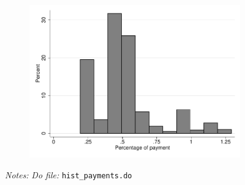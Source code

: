 \documentclass[11pt]{article}
\begin{document}
\begin{figure}[H]
\begin{center}
\begin{subfigure}{.31\textwidth}
        \includegraphics[width=\textwidth]{Figuras/hist_porc_pay_cond_pro_9.pdf}    
    \end{subfigure}        
    \end{center}
     \footnotesize \textit{Notes: } 
      \footnotesize{ \textit{Do file: }  \texttt{hist\_payments.do}}
\end{figure}



    
    
\end{document}
